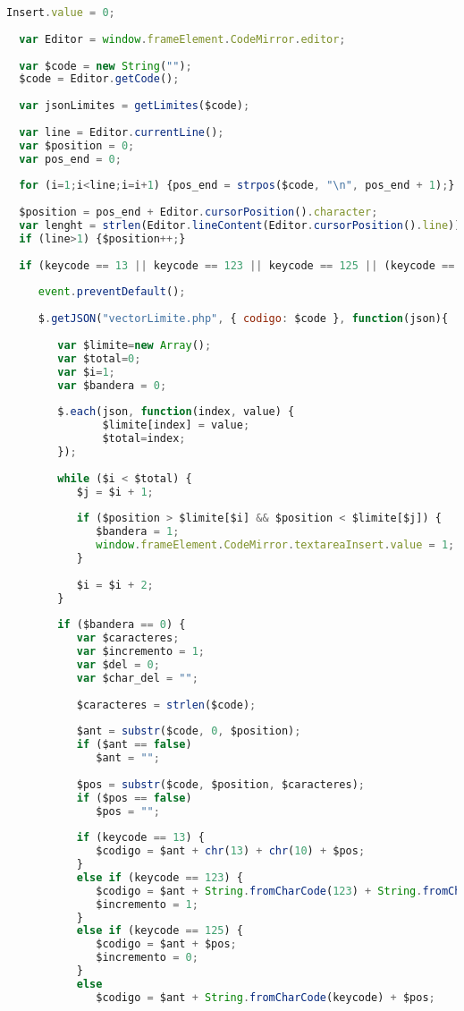 \begin{lstlisting}[language=Javascript]
  Insert.value = 0;
  
  var Editor = window.frameElement.CodeMirror.editor;
	
  var $code = new String("");
  $code = Editor.getCode();
  
  var jsonLimites = getLimites($code);
  
  var line = Editor.currentLine();
  var $position = 0;
  var pos_end = 0;
	
  for (i=1;i<line;i=i+1) {pos_end = strpos($code, "\n", pos_end + 1);}
  	
  $position = pos_end + Editor.cursorPosition().character;
  var lenght = strlen(Editor.lineContent(Editor.cursorPosition().line));
  if (line>1) {$position++;}
	
  if (keycode == 13 || keycode == 123 || keycode == 125 || (keycode == 32 && getLevel($code, $position) == 0) || keycode == 59) {
	
     event.preventDefault();
  
     $.getJSON("vectorLimite.php", { codigo: $code }, function(json){
  	
        var $limite=new Array();
        var $total=0;
        var $i=1;
        var $bandera = 0;
  	   
  	    $.each(json, function(index, value) { 
               $limite[index] = value;
  			   $total=index;
        });
	   
	    while ($i < $total) {
	   	   $j = $i + 1;
	   	 
           if ($position > $limite[$i] && $position < $limite[$j]) {
	   	      $bandera = 1;
	   	      window.frameElement.CodeMirror.textareaInsert.value = 1;
	   	   }
	   	 
	   	   $i = $i + 2;
	    }
	   
	    if ($bandera == 0) {
	   	   var $caracteres;
	   	   var $incremento = 1;
	   	   var $del = 0;
	   	   var $char_del = "";
	   	   
	   	   $caracteres = strlen($code);
	   	   
	   	   $ant = substr($code, 0, $position);
	   	   if ($ant == false)
	   	      $ant = "";
	   	      
	   	   $pos = substr($code, $position, $caracteres);
	   	   if ($pos == false)
	   	      $pos = "";
	   	  
	   	   if (keycode == 13) {
	   	   	  $codigo = $ant + chr(13) + chr(10) + $pos;
	   	   }
	   	   else if (keycode == 123) {
	   	      $codigo = $ant + String.fromCharCode(123) + String.fromCharCode(125) + $pos;
	   	      $incremento = 1;
	   	   }
	   	   else if (keycode == 125) {
	   	   	  $codigo = $ant + $pos;
	   	   	  $incremento = 0;
	   	   }
	   	   else
	   	      $codigo = $ant + String.fromCharCode(keycode) + $pos;
	   			  	    

\end{lstlisting}
